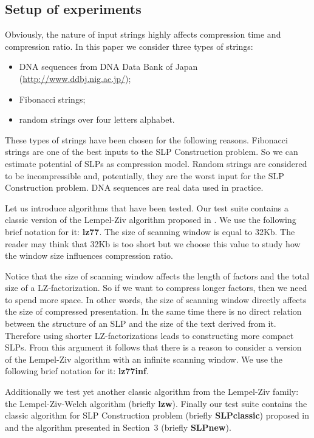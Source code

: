 \documentclass[10pt]{article}
\begin{document}
\subsection{Setup of experiments}
Obviously, the nature of input strings highly affects compression time and compression ratio. In this paper we consider
three types of strings:

\begin{itemize}
  \item DNA sequences from DNA Data Bank of Japan (\url{http://www.ddbj.nig.ac.jp/});
  \item Fibonacci strings;
  \item random strings over four letters alphabet.
\end{itemize}

These types of strings have been chosen for the following reasons. Fibonacci strings are one of the best inputs to the
SLP Construction problem. So we can estimate potential of SLPs as compression model. Random strings are considered
to be incompressible and, potentially, they are the worst input for the SLP Construction problem. DNA sequences are real
data used in practice.

Let us introduce algorithms that have been tested. Our test suite contains a classic version of the Lempel-Ziv algorithm
proposed in \cite{LZ77}. We use the following brief notation for it: \textbf{lz77}. The size of scanning window is equal
to 32Kb. The reader may think that 32Kb is too short but we choose this value to study how the window size influences
compression ratio.

Notice that the size of scanning window affects the length of factors and the total size of a LZ-factorization. So if we
want to compress longer factors, then we need to spend more space. In other words, the size of scanning window directly
affects the size of compressed presentation. In the same time there is no direct relation between the structure of an
SLP and the size of the text derived from it. Therefore using shorter LZ-factorizations leads to constructing more
compact SLPs. From this argument it follows that there is a reason to consider a version of the Lempel-Ziv algorithm
with an infinite scanning window. We use the following brief notation for it: \textbf{lz77inf}.

Additionally we test yet another classic algorithm from the Lempel-Ziv family: the Lempel-Ziv-Welch algorithm (briefly
\textbf{lzw}). Finally our test suite contains the classic algorithm for SLP Construction problem (briefly
\textbf{SLPclassic}) proposed in \cite{SLPConstruction} and the algorithm presented in Section~3 (briefly
\textbf{SLPnew}).
\end{document}
